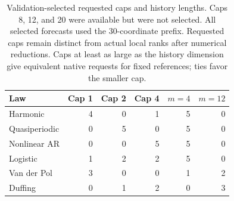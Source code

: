 \begin{table}[htbp]
\centering\small
\begin{tabular}{@{}lrrrrr@{}}
\toprule
Law & Cap 1 & Cap 2 & Cap 4 & $m=4$ & $m=12$ \\
\midrule
Harmonic & 4 & 0 & 1 & 5 & 0 \\
Quasiperiodic & 0 & 5 & 0 & 5 & 0 \\
Nonlinear AR & 0 & 0 & 5 & 5 & 0 \\
Logistic & 1 & 2 & 2 & 5 & 0 \\
Van der Pol & 3 & 0 & 0 & 1 & 2 \\
Duffing & 0 & 1 & 2 & 0 & 3 \\
\bottomrule
\end{tabular}
\caption{Validation-selected requested caps and history lengths.
Caps 8, 12, and 20 were available but were not selected.
All selected forecasts used the 30-coordinate prefix. Requested caps
remain distinct from actual local ranks after numerical reductions.
Caps at least as large as the history dimension give equivalent native
requests for fixed references; ties favor the smaller cap.}
\label{tab:dimension-policy-choices}
\end{table}
